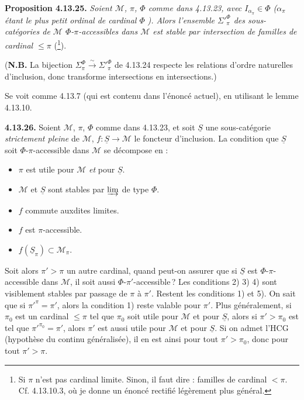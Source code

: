 \textbf{Proposition 4.13.25.} \textit{Soient $\mathcal{M}$, $\pi$, $\Phi$ comme dans 4.13.23, avec $I_{\alpha_\pi}\in\Phi$ ($\alpha_\pi$ étant le plus petit ordinal de cardinal $\Phi$} \textit{). Alors l'ensemble ${\Sigma'}^{\Phi}_{\pi}$ des sous-catégories de $\mathcal{M}$ $\Phi$-$\pi$-accessibles dans $\mathcal{M}$ est stable par intersection de familles de cardinal $\leqslant\pi$} (\footnote{Si $\pi$ n'est pas cardinal limite. Sinon, il faut dire : familles de cardinal $<\pi$. Cf. 4.13.10.3, où je donne un énoncé rectifié légèrement plus général.}).

(\textbf{N.B.} La bijection $\Sigma^{\Phi}_{\pi}\xrightarrow{\ \sim\ }{\Sigma'}^{\Phi}_{\pi}$ de 4.13.24 respecte les relations d'ordre naturelles d'inclusion, donc transforme intersections en intersections.)

Se voit comme 4.13.7 (qui est contenu dans l'énoncé actuel), en utilisant le lemme 4.13.10.

\textbf{4.13.26.} Soient $\mathcal{M}$, $\pi$, $\Phi$ comme dans 4.13.23, et soit $\underline{S}$ une sous-catégorie \textit{strictement pleine} de $\mathcal{M}$, $f:\underline{S}\longrightarrow\mathcal{M}$ le foncteur d'inclusion. La condition que $\underline{S}$ soit $\Phi$-$\pi$-accessible dans $\mathcal{M}$ se décompose en :
\begin{itemize}[leftmargin=2.5em]
\item[1)] $\pi$ est utile pour $\mathcal{M}$ \textit{et} pour $\underline{S}$.
\item[2)] $\mathcal{M}$ et $\underline{S}$ sont stables par $\varinjlim$ de type $\Phi$.
\item[3)] $f$ commute auxdites limites.
\item[4)] $f$ est $\pi$-accessible.
\item[5)] $f(\underline{S}_\pi)\subset\mathcal{M}_\pi$.
\end{itemize}

Soit alors $\pi'>\pi$ un autre cardinal, quand peut-on assurer que si $\underline{S}$ est $\Phi$-$\pi$-accessible dans $\mathcal{M}$, il soit aussi $\Phi$-$\pi'$-accessible\,? Les conditions 2) 3) 4) sont visiblement stables par passage de $\pi$ à $\pi'$. Restent les conditions 1) et 5). On sait que si $\pi'^{\pi}=\pi'$, alors la condition 1) reste valable pour $\pi'$. Plus généralement, si $\pi_0$ est un cardinal $\leqslant\pi$ tel que $\pi_0$ soit utile pour $\mathcal{M}$ et pour $\underline{S}$, alors si $\pi'>\pi_0$ est tel que $\pi'^{\pi_0}=\pi'$, alors $\pi'$ est aussi utile pour $\mathcal{M}$ et pour $\underline{S}$. Si on admet l'HCG (hypothèse du continu généralisée), il en est ainsi pour tout $\pi'>\pi_0$, donc pour tout $\pi'>\pi$.

